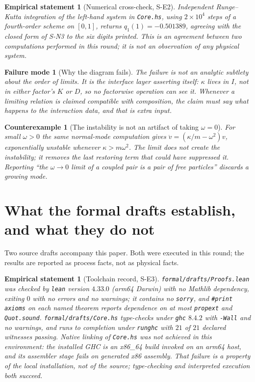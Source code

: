 \documentclass[11pt]{article}
\theoremstyle{plain}
\newtheorem{empirical}[definition]{Empirical statement}
\newtheorem{counterexample}[definition]{Counterexample}
\newtheorem{failuremode}[definition]{Failure mode}
\begin{document}
\begin{empirical}[Numerical cross-check, S-E2]
\label{emp:numeric}
Independent Runge--Kutta integration of the left-hand system in
\texttt{Core.hs}, using $2\times10^{4}$ steps of a fourth-order scheme on
$[0,1]$, returns $q_1(1)=-0.501389$, agreeing with the closed form of S-N3 to
the six digits printed. This is an agreement between two computations performed
in this round; it is not an observation of any physical system.
\end{empirical}

\begin{failuremode}[Why the diagram fails]
The failure is not an analytic subtlety about the order of limits. It is the
interface layer asserting itself: $\kappa$ lives in $I$, not in either factor's
$K$ or $D$, so no factorwise operation can see it. Whenever a limiting relation
is claimed compatible with composition, the claim must say what happens to the
interaction data, and that is extra input.
\end{failuremode}

\begin{counterexample}[The instability is not an artifact of taking $\omega=0$]
For small $\omega>0$ the same normal-mode computation gives
$\ddot v=(\kappa/m-\omega^2)v$, exponentially unstable whenever
$\kappa>m\omega^2$. The limit does not create the instability; it removes the
last restoring term that could have suppressed it. Reporting ``the $\omega\to0$
limit of a coupled pair is a pair of free particles'' discards a growing mode.
\end{counterexample}

\section{What the formal drafts establish, and what they do not}
\label{sec:formal}

Two source drafts accompany this paper. Both were executed in this round; the
results are reported as process facts, not as physical facts.

\begin{empirical}[Toolchain record, S-E3]
\label{emp:toolchain}
\texttt{formal/drafts/Proofs.lean} was checked by \texttt{lean} version
$4.33.0$ (arm64 Darwin) with no Mathlib dependency, exiting $0$ with no errors
and no warnings; it contains no \texttt{sorry}, and \texttt{\#print axioms} on
each named theorem reports dependence on at most \texttt{propext} and
\texttt{Quot.sound}. \texttt{formal/drafts/Core.hs} type-checks under
\texttt{ghc} $8.4.2$ with \texttt{-Wall} and no warnings, and runs to completion
under \texttt{runghc} with $21$ of $21$ declared witnesses passing. Native
linking of \texttt{Core.hs} was \emph{not} achieved in this environment: the
installed GHC is an x86\_64 build invoked on an arm64 host, and its assembler
stage fails on generated x86 assembly. That failure is a property of the local
installation, not of the source; type-checking and interpreted execution both
succeed.
\end{empirical}
\end{document}
